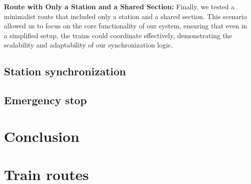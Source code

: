\documentclass{article}
\begin{document}
    \textbf{Route with Only a Station and a Shared Section:} Finally, we tested a minimalist route that included only a station and a shared section. This scenario allowed us to focus on the core functionality of our system, ensuring that even in a simplified setup, the trains could coordinate effectively, demonstrating the scalability and adaptability of our synchronization logic.


    \subsection*{Station synchronization}

    \subsection*{Emergency stop}

    \section{Conclusion}

    \appendix

    \section{Train routes}
\end{document}
